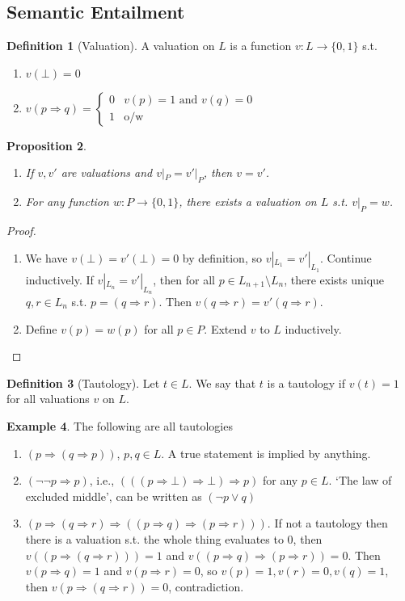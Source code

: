 \documentclass{article}
\theoremstyle{definition}
\newtheorem{defn}{Definition}[section]
\newtheorem{example}[defn]{Example}
\theoremstyle{remark}
\theoremstyle{plain}
\newtheorem{prop}[defn]{Proposition}
\begin{document}
\subsection{Semantic Entailment}
\begin{defn}[Valuation]
    A valuation on $L$ is a function $v:L\to\{0,1\}$ s.t. 
    \begin{enumerate}
        \item[(i)] $v(\bot)=0$
        \item[(ii)] $v(p\Rightarrow q)=\begin{cases}
            0 & v(p)=1 \text{ and } v(q)=0\\
            1 & \text{o/w}
        \end{cases}$
    \end{enumerate}
\end{defn}
\begin{prop}\
    \begin{enumerate}
        \item[(i)] If $v,v'$ are valuations and $v|_P=v'|_P$, then $v=v'$.
        \item[(ii)] For any function $w:P\to\{0,1\}$, there exists a valuation on $L$ s.t. $v|_P=w$.
    \end{enumerate}
\end{prop}
\begin{proof}\
    \begin{enumerate}
        \item[(i)] We have $v(\bot)=v'(\bot)=0$ by definition, so $v|_{L_1}=v'|_{L_1}$. Continue inductively. If $v|_{L_n}=v'|_{L_{n}}$, then for all $p\in L_{n+1}\setminus L_n$, there exists unique $q,r\in L_n$ s.t. $p=(q\Rightarrow r)$. Then $v(q\Rightarrow r)=v'(q\Rightarrow r)$.
        \item[(ii)] Define $v(p)=w(p)$ for all $p\in P$. Extend $v$ to $L$ inductively.
    \end{enumerate}
\end{proof}
\begin{defn}[Tautology]
    Let $t\in L$. We say that $t$ is a tautology if $v(t)=1$ for all valuations $v$ on $L$.
\end{defn}
\begin{example}
    The following are all tautologies
    \begin{enumerate}
        \item[(i)] $(p\Rightarrow (q\Rightarrow p))$, $p,q\in L$. A true statement is implied by anything.
        \item[(ii)] $(\neg\neg p\Rightarrow p)$, i.e., $(((p\Rightarrow\bot)\Rightarrow\bot)\Rightarrow p)$ for any $p\in L$. `The law of excluded middle', can be written as $(\neg p\vee q)$
        \item[(iii)] $(p\Rightarrow(q\Rightarrow r)\Rightarrow ((p\Rightarrow q)\Rightarrow(p\Rightarrow r)))$. If not a tautology then there is a valuation s.t. the whole thing evaluates to $0$, then $v((p\Rightarrow(q\Rightarrow r)))=1$ and $v((p\Rightarrow q)\Rightarrow(p\Rightarrow r))=0$. Then $v(p\Rightarrow q)=1$ and $v(p\Rightarrow r)=0$, so $v(p)=1, v(r)=0, v(q)=1$, then $v(p\Rightarrow (q\Rightarrow r))=0$, contradiction.
    \end{enumerate}
\end{example}
\end{document}
